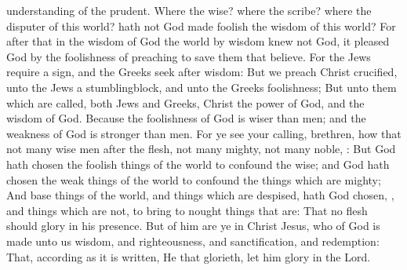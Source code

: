 {understanding of the
prudent.
Where
{} the
wise?
where
{} the
scribe?
where
{} the
disputer of
this
world? hath
not
God made
foolish the
wisdom of
this
world?
For after
that
in the
wisdom of
God the
world
by
wisdom
knew
not
God, it
pleased
God
by the
foolishness of
preaching to
save
them that
believe.
For the
Jews
require a
sign,
and the
Greeks
seek after
wisdom:
But
we
preach
Christ
crucified, unto the
Jews a
stumblingblock,
and unto the
Greeks
foolishness;
But unto
them
which are
called,
both
Jews
and
Greeks,
Christ the
power of
God,
and the
wisdom of
God.
Because the
foolishness of
God
is
wiser than
men;
and the
weakness of
God
is
stronger than
men.
For ye
see
your
calling,
brethren, how
that
not
many wise
men
after the
flesh,
not
many
mighty,
not
many
noble,
{}:
But
God hath
chosen the foolish
things of the
world
to
confound the
wise;
and
God hath
chosen the weak
things of the
world
to
confound the
things which are
mighty;
And base
things of the
world,
and
things which are
despised,
hath
God
chosen,
{},
and
things which
are
not,
to bring to
nought
things that
are:
That
no
flesh should
glory
in
his
presence.
But
of
him
are
ye
in
Christ
Jesus,
who
of
God is
made unto
us
wisdom,
and
righteousness,
and
sanctification,
and
redemption:
That, according
as it is
written,
He that
glorieth, let him
glory
in the
Lord.

}
